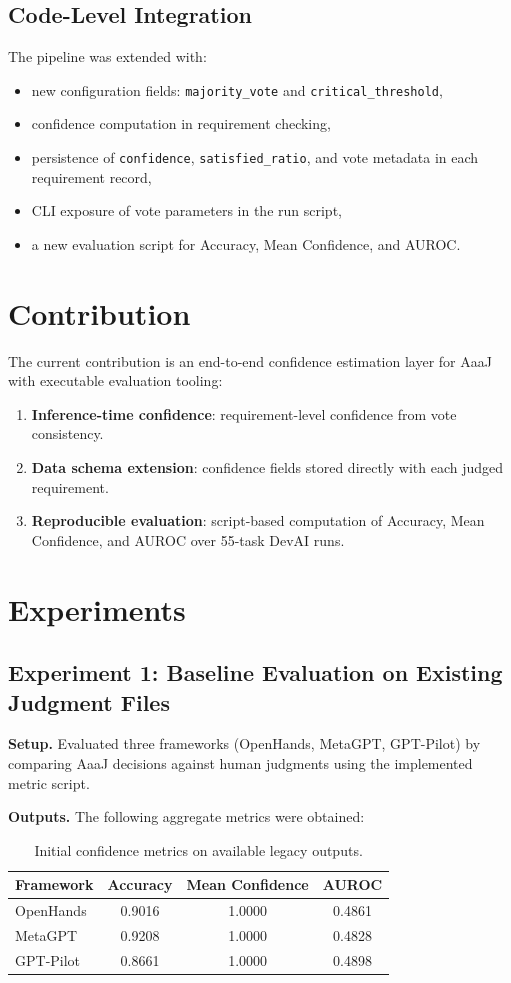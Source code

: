 \documentclass[11pt]{article}
\begin{document}
\subsection{Code-Level Integration}
The pipeline was extended with:
\begin{itemize}[leftmargin=*]
    \item new configuration fields: \texttt{majority\_vote} and \texttt{critical\_threshold},
    \item confidence computation in requirement checking,
    \item persistence of \texttt{confidence}, \texttt{satisfied\_ratio}, and vote metadata in each requirement record,
    \item CLI exposure of vote parameters in the run script,
    \item a new evaluation script for Accuracy, Mean Confidence, and AUROC.
\end{itemize}

\section{Contribution}
The current contribution is an end-to-end confidence estimation layer for AaaJ with executable evaluation tooling:
\begin{enumerate}[leftmargin=*]
    \item \textbf{Inference-time confidence}: requirement-level confidence from vote consistency.
    \item \textbf{Data schema extension}: confidence fields stored directly with each judged requirement.
    \item \textbf{Reproducible evaluation}: script-based computation of Accuracy, Mean Confidence, and AUROC over 55-task DevAI runs.
\end{enumerate}

\section{Experiments}
\subsection{Experiment 1: Baseline Evaluation on Existing Judgment Files}
\textbf{Setup.} Evaluated three frameworks (OpenHands, MetaGPT, GPT-Pilot) by comparing AaaJ decisions against human judgments using the implemented metric script.

\textbf{Outputs.} The following aggregate metrics were obtained:
\begin{table}[h]
\centering
\begin{tabular}{lccc}
\toprule
Framework & Accuracy & Mean Confidence & AUROC \\
\midrule
OpenHands & 0.9016 & 1.0000 & 0.4861 \\
MetaGPT & 0.9208 & 1.0000 & 0.4828 \\
GPT-Pilot & 0.8661 & 1.0000 & 0.4898 \\
\bottomrule
\end{tabular}
\caption{Initial confidence metrics on available legacy outputs.}
\end{table}
\end{document}
